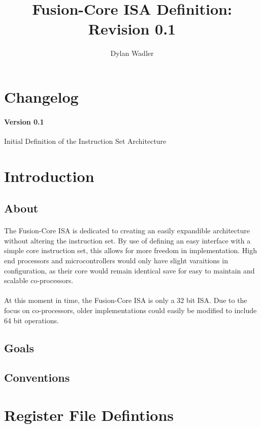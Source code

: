 \documentclass[letterpaper]{article}
\title{Fusion-Core ISA Definition: Revision 0.1}
\author{Dylan Wadler}
\begin{document}
\maketitle
\newpage
\tableofcontents


\newpage
\section{Changelog}
\paragraph{Version 0.1} Initial Definition of the Instruction Set Architecture

\section{Introduction}

\subsection{About}
\paragraph{}The Fusion-Core ISA is dedicated to creating an easily expandible architecture without altering
the instruction set. By use of defining an easy interface with a simple core instruction set, this allows for
more freedom in implementation. High end processors and microcontrollers would only have slight varaitions in
configuration, as their core would remain identical save for easy to maintain and scalable co-processors.
\paragraph{}At this moment in time, the Fusion-Core ISA is only a 32 bit ISA. Due to the focus on co-processors,
older implementations could easily be modified to include 64 bit operations.


\subsection{Goals}
\subsection{Conventions}



\section{Register File Defintions}
\end{document}

